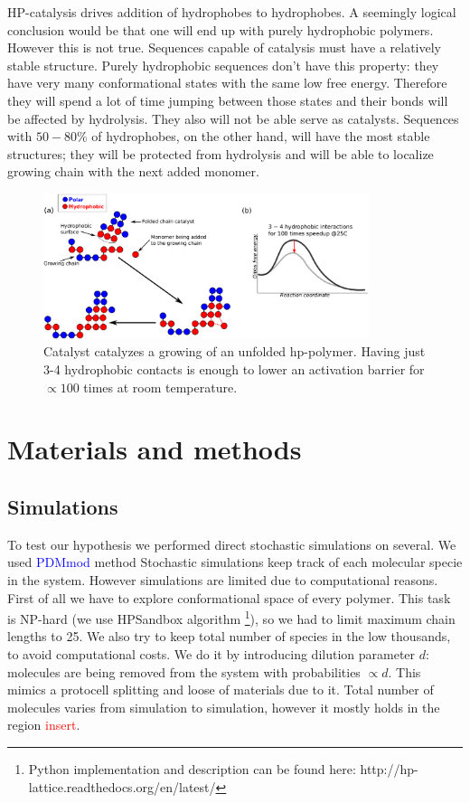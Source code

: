 \documentclass[12pt]{paper}
\newcommand{\red}[1]{\textcolor{red}{#1}}
\newcommand{\blue}[1]{\textcolor{blue}{#1}}
\begin{document}
HP-catalysis drives addition of hydrophobes to hydrophobes. A seemingly logical conclusion would 
be that one will end up with purely hydrophobic polymers. However this is not true. Sequences 
capable of catalysis must have a relatively stable structure. Purely hydrophobic sequences don't 
have this property: they have very many conformational states with the same low free energy. 
Therefore they will spend a lot of time jumping between those states and their bonds will be 
affected by hydrolysis. They also will not be able serve as catalysts. Sequences with $50-80\%$ 
of hydrophobes, on the other hand, will have the most stable structures; they will 
be protected from hydrolysis and will be able to localize growing chain with the next added 
monomer.
\begin{figure}[h!]
  \centering
  \includegraphics[width=0.85\textwidth]{pictures/hp-catalysis.pdf} 
  \caption{Catalyst catalyzes a growing of an unfolded hp-polymer. 
           Having just 3-4 hydrophobic contacts is enough to lower an 
           activation barrier for $\propto 100$ times at room 
           temperature.}
  \label{fig:hp-catalysis}
\end{figure}


\section{Materials and methods}\label{sec:mat}
\subsection{Simulations}\label{sec:mat-sim}
To test our hypothesis we performed direct stochastic simulations on several. We used 
\blue{PDMmod} method \cite{Bernatskiy}
Stochastic simulations keep track of each 
molecular specie in the system. However simulations are limited due to computational reasons. First 
of all we have to explore conformational space of every polymer. This task is NP-hard (we use 
HPSandbox algorithm\cite{lau1989lattice,Dill2008} \footnote{Python implementation and description 
can be found here: http://hp-lattice.readthedocs.org/en/latest/}), so we had to limit 
maximum chain lengths to 25. We also try to keep total number of species in the low thousands, to 
avoid computational costs. We do it by introducing dilution parameter $d$: molecules are being 
removed from the system with probabilities $\propto d$. This mimics a protocell splitting and 
loose of materials due to it. Total number of molecules varies from simulation to simulation, 
however it mostly holds in the region \red{insert}.
\end{document}
